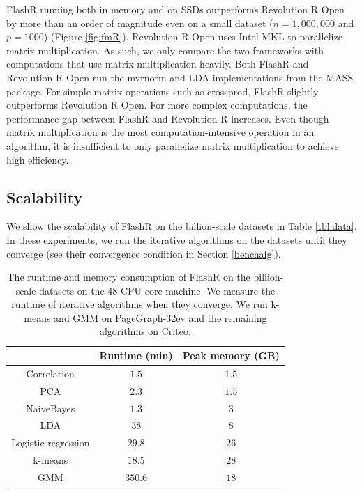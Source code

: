 FlashR running both in memory and on SSDs outperforms Revolution R Open by more
than an order of magnitude even on a small dataset ($n=1,000,000$ and $p=1000$)
(Figure \ref{fig:fmR}).
Revolution R Open uses Intel MKL to parallelize matrix multiplication. As such,
we only compare the two frameworks with computations that use matrix
multiplication heavily. Both FlashR and Revolution R Open run the mvrnorm
and LDA implementations from the MASS package. For simple matrix operations
such as crossprod, FlashR slightly outperforms Revolution R Open.
For more complex computations, the performance gap between FlashR and
Revolution R increases. Even though matrix multiplication
is the most computation-intensive operation in an algorithm, it is insufficient
to only parallelize matrix multiplication to achieve high efficiency.

\subsection{Scalability}

We show the scalability of FlashR on the billion-scale datasets in Table
\ref{tbl:data}. In these experiments, we run the iterative algorithms on
the datasets until they converge (see their convergence condition in Section
\ref{benchalg}).

\begin{table}
\begin{center}
	\caption{The runtime and memory consumption of FlashR on the billion-scale
		datasets on the 48 CPU core machine. We measure the runtime of
                iterative algorithms when they converge. We run k-means and GMM
		on PageGraph-32ev and the remaining algorithms on Criteo.}
\vspace{-10pt}
\footnotesize
\begin{tabular}{|c|c|c|}
\hline
	& Runtime (min) & Peak memory (GB) \\
\hline
Correlation & $1.5$ & $1.5$ \\
\hline
PCA & $2.3$ & $1.5$ \\
\hline
NaiveBayes & $1.3$ & $3$ \\
\hline
LDA & $38$ & $8$ \\
\hline
Logistic regression & $29.8$ & $26$ \\
\hline
k-means & $18.5$ & $28$ \\
\hline
GMM & $350.6$ & $18$ \\
\hline
\end{tabular}
\normalsize
\label{tbl:scale}
\end{center}
\vspace{-10pt}
\end{table}

